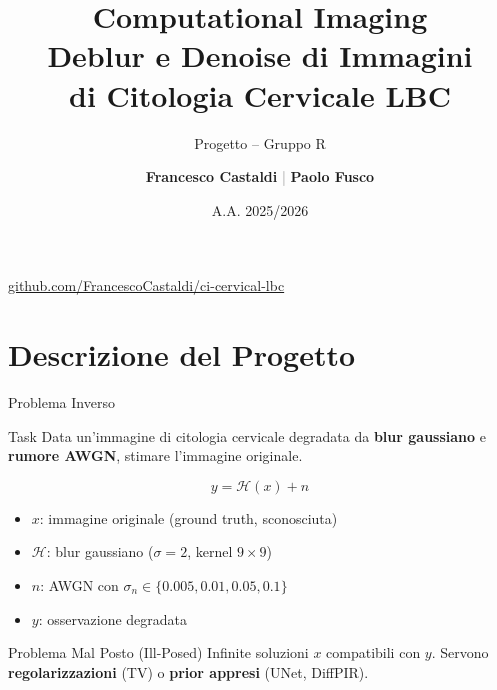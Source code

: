 \documentclass[italian,10pt]{beamer}
\title[CI -- Deblur \& Denoise LBC]{\textbf{Computational Imaging}\\Deblur e Denoise di Immagini\\di Citologia Cervicale LBC}
\subtitle{Progetto -- Gruppo R}
\author[Castaldi, Fusco]{\textbf{Francesco Castaldi}\; \textcolor{gray}{|}\; \textbf{Paolo Fusco}}
\institute[DISI -- UniBO]{Dipartimento di Informatica -- Scienza e Ingegneria\\Universita di Bologna}
\date{A.A. 2025/2026}
\begin{document}
\begin{frame}[plain]
  \titlepage
  \vspace{-0.5cm}
  \begin{center}
    \small\href{https://github.com/FrancescoCastaldi/ci-cervical-lbc}{github.com/FrancescoCastaldi/ci-cervical-lbc}
  \end{center}
\end{frame}

\section{Descrizione del Progetto}

\begin{frame}{Problema Inverso}
  \begin{block}{Task}
    Data un'immagine di citologia cervicale degradata da \textbf{blur gaussiano} e \textbf{rumore AWGN}, stimare l'immagine originale.
  \end{block}
  \begin{equation*}
    y = \mathcal{H}(x) + n
  \end{equation*}
  \begin{itemize}
    \item $x$: immagine originale (ground truth, sconosciuta)
    \item $\mathcal{H}$: blur gaussiano ($\sigma=2$, kernel $9\times9$)
    \item $n$: AWGN con $\sigma_n \in \{0.005, 0.01, 0.05, 0.1\}$
    \item $y$: osservazione degradata
  \end{itemize}
  \begin{alertblock}{Problema Mal Posto (Ill-Posed)}
    Infinite soluzioni $x$ compatibili con $y$. Servono \textbf{regolarizzazioni} (TV) o \textbf{prior appresi} (UNet, DiffPIR).
  \end{alertblock}
\end{frame}
\end{document}
